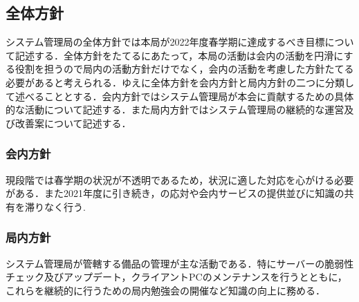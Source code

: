 \subsection*{全体方針}

システム管理局の全体方針では本局が2022年度春学期に達成するべき目標について記述する．全体方針をたてるにあたって，本局の活動は会内の活動を円滑にする役割を担うので局内の活動方針だけでなく，会内の活動を考慮した方針たてる必要があると考えられる．ゆえに全体方針を会内方針と局内方針の二つに分類して述べることとする．会内方針ではシステム管理局が本会に貢献するための具体的な活動について記述する．また局内方針ではシステム管理局の継続的な運営及び改善案について記述する．

\subsubsection*{会内方針}
現段階では春学期の状況が不透明であるため，状況に適した対応を心がける必要がある．また2021年度に引き続き，\firstGrade{}の応対や会内サービスの提供並びに知識の共有を滞りなく行う.

\subsubsection*{局内方針}
システム管理局が管轄する備品の管理が主な活動である．特にサーバーの脆弱性チェック及びアップデート，クライアントPCのメンテナンスを行うとともに，これらを継続的に行うための局内勉強会の開催など知識の向上に務める．


